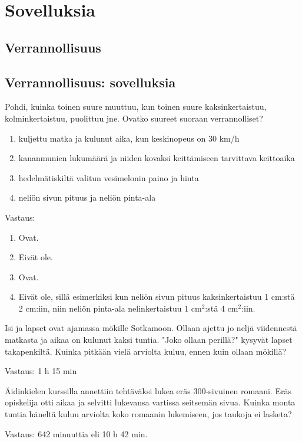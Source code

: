 %
\part{Sovelluksia}
%
%
\chapter{Verrannollisuus}
\chapter{Verrannollisuus: sovelluksia}

\begin{tehtava}
Pohdi, kuinka toinen suure muuttuu, kun toinen suure kaksinkertaistuu, kolminkertaistuu, puolittuu jne. Ovatko suureet suoraan verrannolliset?
\begin{enumerate}
\item kuljettu matka ja kulunut aika, kun keskinopeus on 30 km/h
\item kananmunien lukumäärä ja niiden kovaksi keittämiseen tarvittava keittoaika
\item hedelmätiskiltä valitun vesimelonin paino ja hinta
\item neliön sivun pituus ja neliön pinta-ala
\end{enumerate}
\begin{vastaus}
Vastaus:
\begin{enumerate}
\item Ovat.
\item Eivät ole.
\item Ovat.
\item Eivät ole, sillä esimerkiksi kun neliön sivun pituus kaksinkertaistuu 1 cm:stä 2 cm:iin, niin neliön pinta-ala nelinkertaistuu 1 cm$^2$:stä 4 cm$^2$:iin.
\end{enumerate}
\end{vastaus}
\end{tehtava}

\begin{tehtava}
Isi ja lapset ovat ajamassa mökille Sotkamoon. Ollaan ajettu jo neljä viidennestä matkasta ja aikaa on kulunut kaksi tuntia. "Joko ollaan perillä?" kysyvät lapset takapenkiltä. Kuinka pitkään vielä arviolta kuluu, ennen kuin ollaan mökillä?
\begin{vastaus}
Vastaus: 1 h 15 min
\end{vastaus}
\end{tehtava}

\begin{tehtava}
Äidinkielen kurssilla annettiin tehtäväksi lukea eräs 300-sivuinen romaani. Eräs opiskelija otti aikaa ja selvitti lukevansa vartissa seitsemän sivua. Kuinka monta tuntia häneltä kuluu arviolta koko romaanin lukemiseen, jos taukoja ei lasketa?
\begin{vastaus}
Vastaus: 642 minuuttia eli 10 h 42 min.
\end{vastaus}
\end{tehtava}


